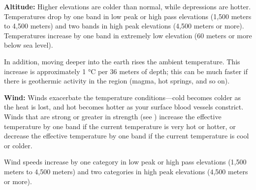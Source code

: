 \textbf{Altitude:} Higher elevations are colder than normal, while depressions are hotter. Temperatures drop by one band in low peak or high pass elevations (1,500 meters to 4,500 meters) and two bands in high peak elevations (4,500 meters or more). Temperatures increase by one band in extremely low elevation (60 meters or more below sea level).

In addition, moving deeper into the earth rises the ambient temperature. This increase is approximately 1 °C per 36 meters of depth; this can be much faster if there is geothermic activity in the region (magma, hot springs, and so on).

\textbf{Wind:} Winds exacerbate the temperature conditions---cold becomes colder as the heat is lost, and hot becomes hotter as your surface blood vessels constrict. Winds that are strong or greater in strength (see ) increase the effective temperature by one band if the current temperature is very hot or hotter, or decrease the effective temperature by one band if the current temperature is cool or colder.

Wind speeds increase by one category in low peak or high pass elevations (1,500 meters to 4,500 meters) and two categories in high peak elevations (4,500 meters or more).


